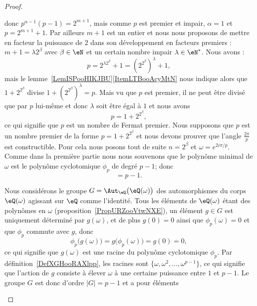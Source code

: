 \begin{proof}
\begin{subproof}
\begin{equation}
		\end{equation}
		donc \( p^{\alpha-1}(p-1)=2^{m+1}\), mais comme \( p\) est premier et impair, \( \alpha=1\) et \( p=2^{m+1}+1\). Par ailleurs \( m+1\) est un entier et nous nous proposons de mettre en facteur la puissance de \( 2\) dans son développement en facteurs premiers : \( m+1=\lambda 2^{\beta}\) avec \( \beta\in \eN\) et un certain nombre impair \( \lambda\in \eN^*\). Nous avons :
		\begin{equation}
			p=2^{\lambda 2^{\beta}}+1=\left( 2^{2^{\beta}} \right)^{\lambda}+1,
		\end{equation}
		mais le lemme~\ref{LemISPooHIKJBU}\ref{ItemLTBooAcyMtN} nous indique alors que \( 1+2^{2^{\beta}}\) divise \( 1+\left( 2^{2^{\beta}} \right)^{\lambda}=p\). Mais vu que \( p\) est premier, il ne peut être divisé que par \( p\) lui-même et donc \( \lambda\) soit être égal à \( 1\) et nous avons
		\begin{equation}
			p=1+2^{2^{\beta}},
		\end{equation}
		ce qui signifie que \( p\) est un nombre de Fermat premier.
		Nous supposons que \( p\) est un nombre premier de la forme \( p=1+2^{2^{\beta}}\) et nous devons prouver que l'angle \( \frac{ 2\pi }{ p }\) est constructible. Pour cela nous posons tout de suite \( n=2^{\beta}\) et \( \omega= e^{2i\pi/p}\). Comme dans la première partie nous nous souvenons que le polynôme minimal de \( \omega\) est le polynôme cyclotomique \( \phi_p\) de degré \( p-1\); donc
		\begin{equation}
			[\eQ(\omega):\eQ]=p-1.
		\end{equation}
		\begin{subproof}
			Nous considérons le groupe \( G=\Aut_{\eQ}\big( \eQ(\omega) \big)\) des automorphismes du corps \( \eQ(\omega)\) agissant sur \( \eQ\) comme l'identité. Tous les éléments de \( \eQ(\omega)\) étant des polynômes en \( \omega\) (proposition~\ref{PropURZooVtwNXE}), un élément \( g\in G\) est uniquement déterminé par \( g(\omega)\), et de plus \( g(0)=0\) ainsi que \( \phi_p(\omega)=0\) et que \( \phi_p\) commute avec \( g\), donc
			\begin{equation}
				\phi_p\big( g(\omega) \big)=g\big( \phi_p(\omega) \big)=g(0)=0,
			\end{equation}
			ce qui signifie que \( g(\omega)\) est une racine du polynôme cyclotomique \( \phi_p\). Par définition~\ref{DefXGHooRAXlpp}, les racines sont \( \{ \omega,\omega^2,\ldots, \omega^{p-1} \}\), ce qui signifie que l'action de \( g\) consiste à élever \( \omega\) à une certaine puissance entre \( 1\) et \( p-1\). Le groupe \( G\) est donc d'ordre \( | G |=p-1\) et a pour éléments

\end{subproof}
\end{subproof}
\end{proof}
